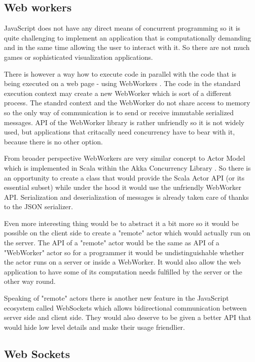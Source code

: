 \documentclass[12pt,a4paper]{report}
\begin{document}
\subsection{Web workers}

JavaScript does not have any direct means of concurrent programming so it is quite challenging to implement an application that is computationally demanding and in the same time allowing the user to interact with it. So there are not much games or sophisticated visualization applications.

There is however a way how to execute code in parallel with the code that is being executed on a web page - using WebWorkers \cite{WebWorkers}. The code in the standard execution context may create a new WebWorker which is sort of a different process. The standrd context and the WebWorker do not share access to memory so the only way of communication is to send or receive immutable serialized messages. API of the WebWorker library is rather unfriendly so it is not widely used, but applications that critacally need concurrency have to bear with it, because there is no other option.

From broader perspective WebWorkers are very similar concept to Actor Model \cite{Actors} which is implemented in Scala within the Akka Concurrency Library \cite{Akka}. So there is an opportunity to create a class that would provide the Scala Actor API (or its essential subset) while under the hood it would use the unfriendly WebWorker API. Serialization and deserialization of messages is already taken care of thanks to the JSON serializer. 

Even more interesting thing would be to abstract it a bit more so it would be possible on the client side to create a "remote" actor which would actually run on the server. The API of a "remote" actor would be the same as API of a "WebWorker" actor so for a programmer it would be undistinguishable whether the actor runs on a server or inside a WebWorker. It would also allow the web application to have some of its computation needs fulfilled by the server or the other way round.

Speaking of "remote" actors there is another new feature in the JavaScript ecosystem called WebSockets \cite{WebSockets} which allows bidirectional communication between server side and client side. They would also deserve to be given a better API that would hide low level details and make their usage friendlier.

\subsection{Web Sockets}
\end{document}
